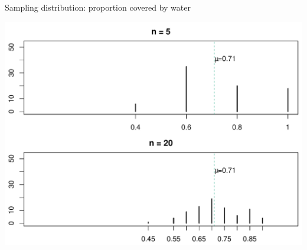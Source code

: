 \documentclass[10pt]{beamer}\usepackage[]{graphicx}\usepackage[]{color}
\makeatletter
\def\maxwidth{ %
  \ifdim\Gin@nat@width>\linewidth
    \linewidth
  \else
    \Gin@nat@width
  \fi
}
\newenvironment{knitrout}{}{} %
\makeatother
\begin{document}
\begin{frame}[fragile]{Sampling distribution: proportion covered by water}
	

	
	
\begin{knitrout}\tiny
{}\color{fgcolor}

{\centering \includegraphics[width=\maxwidth]{figure/unnamed-chunk-11-1} 

}



\end{knitrout}
	
\end{frame}
\end{document}
